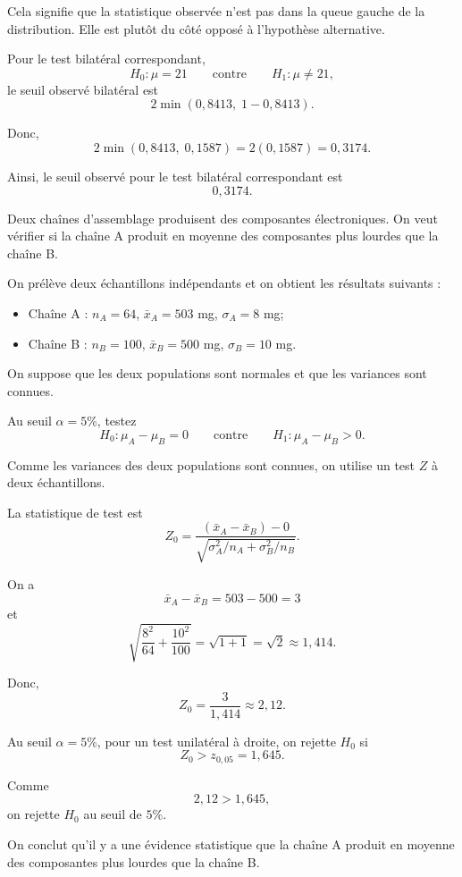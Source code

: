 \begin{questions}
\begin{solution}
Cela signifie que la statistique observée n'est pas dans la queue gauche de la distribution. Elle est plutôt du côté opposé à l'hypothèse alternative.

Pour le test bilatéral correspondant,
\[
H_0:\mu=21
\qquad \text{contre} \qquad
H_1:\mu\neq 21,
\]
le seuil observé bilatéral est
\[
2\min(0{,}8413,\;1-0{,}8413).
\]

Donc,
\[
2\min(0{,}8413,\;0{,}1587)
=
2(0{,}1587)
=
0{,}3174.
\]

Ainsi, le seuil observé pour le test bilatéral correspondant est
\[
\boxed{0{,}3174}.
\]
\end{solution}

\newpage

\question[10]
Deux chaînes d'assemblage produisent des composantes électroniques. On veut vérifier si la chaîne A produit en moyenne des composantes plus lourdes que la chaîne B.

On prélève deux échantillons indépendants et on obtient les résultats suivants :
\begin{itemize}
\item Chaîne A : \(n_A=64\), \(\bar x_A=503\) mg, \(\sigma_A=8\) mg;
\item Chaîne B : \(n_B=100\), \(\bar x_B=500\) mg, \(\sigma_B=10\) mg.
\end{itemize}

On suppose que les deux populations sont normales et que les variances sont connues.

Au seuil \(\alpha=5\%\), testez
\[
H_0:\mu_A-\mu_B=0
\qquad \text{contre} \qquad
H_1:\mu_A-\mu_B>0.
\]

\begin{solution}
Comme les variances des deux populations sont connues, on utilise un test \(Z\) à deux échantillons.

La statistique de test est
\[
Z_0=\frac{(\bar x_A-\bar x_B)-0}{\sqrt{\sigma_A^2/n_A+\sigma_B^2/n_B}}.
\]

On a
\[
\bar x_A-\bar x_B=503-500=3
\]
et
\[
\sqrt{\frac{8^2}{64}+\frac{10^2}{100}}
=\sqrt{1+1}
=\sqrt{2}
\approx 1{,}414.
\]

Donc,
\[
Z_0=\frac{3}{1{,}414}\approx 2{,}12.
\]

Au seuil \(\alpha=5\%\), pour un test unilatéral à droite, on rejette \(H_0\) si
\[
Z_0>z_{0{,}05}=1{,}645.
\]

Comme
\[
2{,}12>1{,}645,
\]
on rejette \(H_0\) au seuil de \(5\%\).

On conclut qu'il y a une évidence statistique que la chaîne A produit en moyenne des composantes plus lourdes que la chaîne B.
\end{solution}
\vspace{2.5in}


\end{questions}
